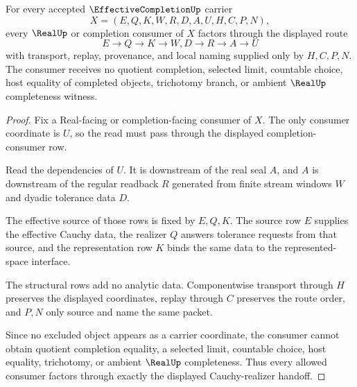 \begin{theorem}
\label{thm:effective-completion-cauchy-realizer-handoff}
For every accepted $\EffectiveCompletionUp$ carrier
$$
X=(E,Q,K,W,R,D,A,U,H,C,P,N),
$$
every $\RealUp$ or completion consumer of $X$ factors through the displayed route
$$
E \longrightarrow Q \longrightarrow K \longrightarrow W,D \longrightarrow R \longrightarrow A \longrightarrow U
$$
with transport, replay, provenance, and local naming supplied only by $H,C,P,N$. The consumer receives no quotient completion, selected limit, countable choice, host equality of completed objects, trichotomy branch, or ambient $\RealUp$ completeness witness.
\end{theorem}
\begin{proof}
Fix a Real-facing or completion-facing consumer of $X$. The only consumer coordinate is $U$, so the read must pass through the displayed completion-consumer row.

Read the dependencies of $U$. It is downstream of the real seal $A$, and $A$ is downstream of the regular readback $R$ generated from finite stream windows $W$ and dyadic tolerance data $D$.

The effective source of those rows is fixed by $E,Q,K$. The source row $E$ supplies the effective Cauchy data, the realizer $Q$ answers tolerance requests from that source, and the representation row $K$ binds the same data to the represented-space interface.

The structural rows add no analytic data. Componentwise transport through $H$ preserves the displayed coordinates, replay through $C$ preserves the route order, and $P,N$ only source and name the same packet.

Since no excluded object appears as a carrier coordinate, the consumer cannot obtain quotient completion equality, a selected limit, countable choice, host equality, trichotomy, or ambient $\RealUp$ completeness. Thus every allowed consumer factors through exactly the displayed Cauchy-realizer handoff.
\end{proof}


